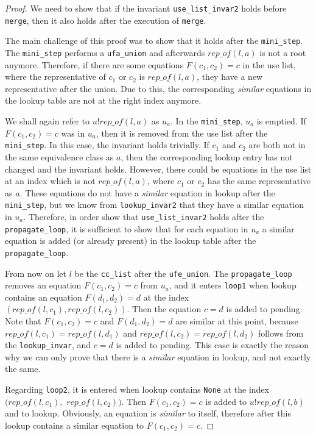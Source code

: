 \begin{proof}
We need to show that if the invariant \lstinline{use_list_invar2} holds before \lstinline{merge}, then it also holds after the execution of \lstinline|merge|.

The main challenge of this proof was to show that it holds after the \lstinline|mini_step|.
The \lstinline|mini_step| performs a \lstinline|ufa_union| and afterwards $rep\_of(l, a)$ is not a root anymore.
Therefore, if there are some equations $F(c_1, c_2) = c$ in the use list, where the representative of $c_1$ or $c_2$ is $rep\_of(l,a)$, they have a new representative after the union. Due to this, the corresponding \emph{similar} equations in the lookup table are not at the right index anymore.

We shall again refer to $u ! rep\_of (l, a)$ as $u_a$.
In the \lstinline{mini_step}, $u_a$ is emptied.
If $F(c_1, c_2) = c$ was in $u_a$, then it is removed from the use list after the \lstinline|mini_step|. In this case, the invariant holds trivially.
If $c_1$ and $c_2$ are both not in the same equivalence class as $a$, then the corresponding lookup entry has not changed and the invariant holds.
However, there could be equations in the use list at an index which is not $rep\_of(l, a)$, where $c_1$ or $c_2$ has the same representative as $a$. These equations do not have a \emph{similar} equation in lookup after the \lstinline{mini_step}, but we know from \lstinline{lookup_invar2} that they have a similar equation in $u_a$.
Therefore, in order show that \lstinline{use_list_invar2} holds after the \lstinline{propagate_loop}, it is sufficient to show that for each equation in $u_a$ a similar equation is added (or already present) in the lookup table after the \lstinline{propagate_loop}.

From now on let $l$ be the \lstinline{cc_list} after the \lstinline{ufe_union}.
The \lstinline{propagate_loop} removes an equation $F(c_1, c_2) = c$ from $u_a$, and it enters \lstinline{loop1} when lookup contains an equation $F(d_1, d_2) = d$ at the index $(rep\_of(l, c_1), rep\_of(l, c_2))$.
Then the equation $c = d$ is added to pending. Note that $F(c_1, c_2) = c$ and $F(d_1, d_2) = d$ are similar at this point, because $rep\_of(l, c_1) = rep\_of(l, d_1)$ and $rep\_of(l, c_2) = rep\_of(l, d_2)$ follows from the \lstinline{lookup_invar}, and $c = d$ is added to pending.
This case is exactly the reason why we can only prove that there is a \emph{similar} equation in lookup, and not exactly the same.

Regarding \lstinline{loop2}, it is entered when lookup contains \lstinline{None} at the index
$(rep\_of(l, c_1),$ $rep\_of(l, c_2))$. Then $F(c_1, c_2) = c$ is added to $u ! rep\_of(l, b)$ and to lookup. Obviously, an equation is \emph{similar} to itself, therefore after this lookup contains a similar equation to $F(c_1, c_2) = c$.
\end{proof}

